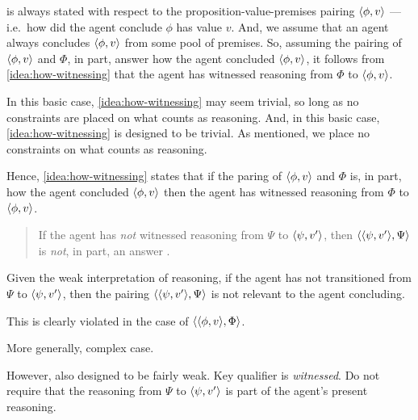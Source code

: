 \begin{note}
  \qHow{} is always stated with respect to the proposition-value-premises pairing \(\langle \phi, v \rangle\) --- i.e.\ how did the agent conclude \(\phi\) has value \(v\).
  And, we assume that an agent always concludes \(\langle \phi, v \rangle\) from some pool of premises.
  So, assuming the pairing of \(\langle \phi, v \rangle\) and \(\Phi\), in part, answer how the agent concluded \(\langle \phi, v \rangle\), it follows from \autoref{idea:how-witnessing} that the agent has witnessed reasoning from \(\Phi\) to \(\langle \phi, v \rangle\).

  In this basic case, \autoref{idea:how-witnessing} may seem trivial, so long as no constraints are placed on what counts as reasoning.
  And, in this basic case, \autoref{idea:how-witnessing} is designed to be trivial.
  As mentioned, we place no constraints on what counts as reasoning.

  Hence, \autoref{idea:how-witnessing} states that if the paring of \(\langle \phi, v \rangle\) and \(\Phi\) is, in part, how the agent concluded \(\langle \phi, v \rangle\) then the agent has witnessed reasoning from \(\Phi\) to \(\langle \phi, v \rangle\).
\end{note}

\begin{note}[Converse]
  \begin{quote}
    If the agent has \emph{not} witnessed reasoning from \(\Psi\) to \(\langle \psi, v' \rangle\), then \(\langle \langle \psi, v' \rangle, \Psi \rangle\) is \emph{not}, in part, an answer \qHow{}.
  \end{quote}
  Given the weak interpretation of reasoning, if the agent has not transitioned from \(\Psi\) to \(\langle \psi, v' \rangle\), then the pairing \(\langle \langle \psi, v' \rangle, \Psi \rangle\) is not relevant to the agent concluding.

  This is clearly violated in the case of \(\langle \langle \phi, v \rangle, \Phi \rangle\).
\end{note}

\begin{note}
  More generally, complex case.
\end{note}

\begin{note}[Weak]
  However, also designed to be fairly weak.
  Key qualifier is \emph{witnessed}.
  Do not require that the reasoning from \(\Psi\) to \(\langle \psi, v' \rangle\) is part of the agent's present reasoning.
\end{note}

